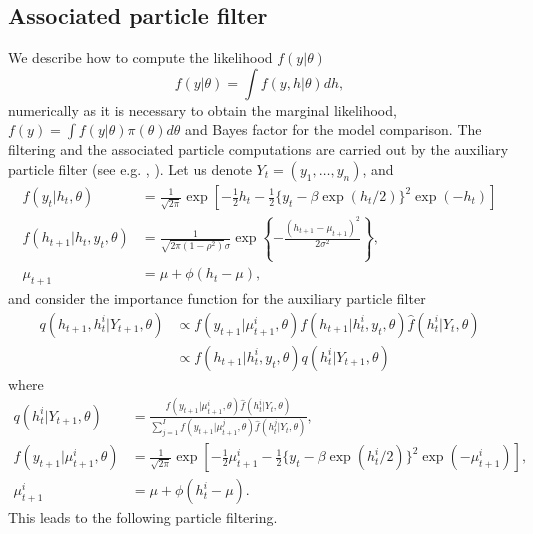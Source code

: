 \subsection{Associated particle filter}
\label{partile filter}
We describe how to compute the likelihood $f(y|\theta)$
\begin{equation*}
    f(y|\theta) = \int f(y, h|\theta) dh,
\end{equation*}
numerically as it is necessary to obtain the marginal likelihood, $f(y) = \int f(y|\theta) \pi(\theta) d\theta$ and Bayes factor for the model comparison. 
The filtering and the associated particle computations are carried out by the auxiliary particle filter (see e.g. \cite{PittShephard(99)}, \cite{OmoriChibShephardNakajima(07)}).
Let us denote $Y_t = (y_1, \dots, y_n)$, and
\begin{align*}
    f(y_t|h_t, \theta) &= \frac{1}{\sqrt{2\pi}} \exp \left[ -\frac{1}{2}h_t - \frac{1}{2} \{ y_t - \beta \exp(h_t/2) \}^2 \exp(-h_t) \right] \\
    f(h_{t+1}|h_t, y_t, \theta) &= \frac{1}{\sqrt{2\pi (1-\rho^2)} \sigma} \exp \left\{ -\frac{(h_{t+1} - \mu_{t+1})^2}{2\sigma^2} \right\}, \\
    \mu_{t+1} &= \mu + \phi(h_t-\mu),
\end{align*}
and consider the importance function for the auxiliary particle filter
\begin{align*}
    q(h_{t+1}, h_t^i| Y_{t+1}, \theta) &\propto  f(y_{t+1}| \mu_{t+1}^i, \theta) f(h_{t+1}|h_t^i, y_t, \theta) \hat{f}(h_t^i|Y_t, \theta) \\
    &\propto f(h_{t+1}|h_t^i, y_t, \theta) q(h_t^i| Y_{t+1}, \theta)
\end{align*}
where
\begin{align*}
    q(h_t^i| Y_{t+1}, \theta) &= \frac{f(y_{t+1}| \mu_{t+1}^i, \theta) \hat{f}(h_t^i|Y_t, \theta)}{\sum_{j=1}^I f(y_{t+1}| \mu_{t+1}^j, \theta) \hat{f}(h_t^j|Y_t, \theta)}, \\
    f(y_{t+1}|\mu_{t+1}^i, \theta) &= \frac{1}{\sqrt{2\pi}} \exp \left[ -\frac{1}{2}\mu_{t+1}^i - \frac{1}{2} \{ y_t -  \beta \exp(h_t^i/2) \}^2 \exp(-\mu_{t+1}^i) \right], \\
    \mu_{t+1}^i &= \mu + \phi(h_t^i-\mu).    
\end{align*}
This leads to the following particle filtering.
